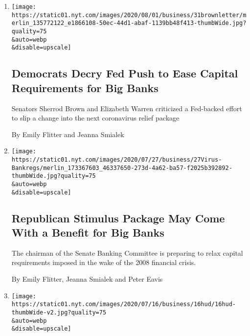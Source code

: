 \begin{enumerate}
\def\labelenumi{\arabic{enumi}.}
\item
  \href{/2020/07/31/business/democrats-fed-banks-capital-requirements.html}{}

  \texttt{[image: https://static01.nyt.com/images/2020/08/01/business/31brownletter/merlin\_135772122\_e1866108-50ec-44d1-abaf-1139bb48f413-thumbWide.jpg?quality=75\\\&auto=webp\\\&disable=upscale]}

  \hypertarget{democrats-decry-fed-push-to-ease-capital-requirements-for-big-banks}{%
  \subsection{Democrats Decry Fed Push to Ease Capital Requirements for
  Big
  Banks}\label{democrats-decry-fed-push-to-ease-capital-requirements-for-big-banks}}

  Senators Sherrod Brown and Elizabeth Warren criticized a Fed-backed
  effort to slip a change into the next coronavirus relief package

  By Emily Flitter and Jeanna Smialek
\item
  \href{/2020/07/27/business/bank-regulations-rollback-stimulus-bill.html}{}

  \texttt{[image: https://static01.nyt.com/images/2020/07/27/business/27Virus-Bankregs/merlin\_173367603\_46337650-273d-4a62-ba57-f2025b392892-thumbWide.jpg?quality=75\\\&auto=webp\\\&disable=upscale]}

  \hypertarget{republican-stimulus-package-may-come-with-a-benefit-for-big-banks}{%
  \subsection{Republican Stimulus Package May Come With a Benefit for
  Big
  Banks}\label{republican-stimulus-package-may-come-with-a-benefit-for-big-banks}}

  The chairman of the Senate Banking Committee is preparing to relax
  capital requirements imposed in the wake of the 2008 financial crisis.

  By Emily Flitter, Jeanna Smialek and Peter Eavis
\item
  \href{/2020/07/16/business/banks-housing-racial-discrimination.html}{}

  \texttt{[image: https://static01.nyt.com/images/2020/07/16/business/16hud/16hud-thumbWide-v2.jpg?quality=75\\\&auto=webp\\\&disable=upscale]}

  \hypertarget{big-banks-revolutionary-request-please-dont-weaken-this-rule}{%
}
\end{enumerate}
